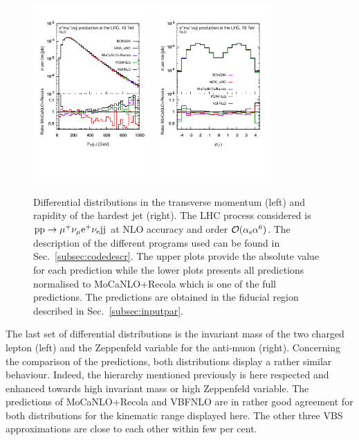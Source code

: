  \begin{figure}[hbt!]
   \centering
   \includegraphics[width=0.4\textwidth,angle=0,clip=true,trim={0.4cm 2cm 0.cm 1.cm}]{figures/NLO/ptj1_NLO.pdf}
   \includegraphics[width=0.4\textwidth,angle=0,clip=true,trim={0.4cm 2cm 0.cm 1.cm}]{figures/NLO/yj1_NLO.pdf}
\caption{\label{fig:distNLO2} Differential distributions in the transverse momentum (left) and rapidity of the hardest jet (right).
The LHC process considered is ${\rm p}{\rm p}\to\mu^+\nu_\mu{\rm e}^+\nu_{\rm e}{\rm j}{\rm j}$ at NLO accuracy and order $\mathcal{O}(\alpha_{\rm s}\alpha^6)$.
The description of the different programs used can be found in Sec.~\ref{subsec:codedescr}.
The upper plots provide the absolute value for each prediction while the lower plots presents all predictions normalised to {\sc MoCaNLO}+{\sc Recola} which is one of the full predictions.
The predictions are obtained in the fiducial region described in Sec.~\ref{subsec:inputpar}.
}
\end{figure}

The last set of differential distributions is the invariant mass of the two charged lepton (left) and the Zeppenfeld variable for the anti-muon (right).
Concerning the comparison of the predictions, both distributions display a rather similar behaviour.
Indeed, the hierarchy mentioned previously is here respected and enhanced towards high invariant mass or high Zeppenfeld variable.
The predictions of {\sc MoCaNLO}+{\sc Recola} and {\sc VBFNLO} are in rather good agreement for both distributions for the kinematic range displayed here.
The other three VBS approximations are close to each other within few per cent.

